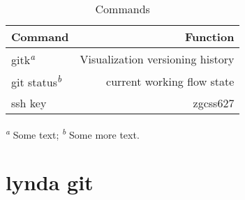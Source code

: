 \documentclass[12pt,letterpaper]{article}
\begin{document}
\begin{table}[htb]
  \caption{Commands}\label{tbl:notes}
  \centering
  \begin{tabular}{lr}
    \toprule
    Command                            & Function \\
    \midrule
    gitk\textsuperscript{\emph{a}}   & Visualization versioning history  \\
    git status\textsuperscript{\emph{b}} & current working flow state \\
    ssh key   & zgcss627\\

    \bottomrule
  \end{tabular}

  \textsuperscript{\emph{a}} Some text;
  \textsuperscript{\emph{b}} Some more text.
\end{table}

\section{lynda git}
\end{document}
